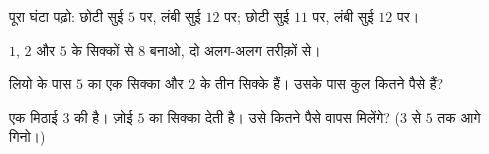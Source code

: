 \begin{exercise}[$\star$]\label{exo:g1:measure:6}
पूरा घंटा पढ़ो: छोटी सुई $5$ पर, लंबी सुई $12$ पर; छोटी
सुई $11$ पर, लंबी सुई $12$ पर।
\end{exercise}

\begin{exercise}[$\star$]\label{exo:g1:measure:7}
$1$, $2$ और $5$ के सिक्कों से $8$ बनाओ, दो अलग-अलग तरीक़ों से।
\end{exercise}

\begin{exercise}[$\star$]\label{exo:g1:measure:8}
लियो के पास $5$ का एक सिक्का और $2$ के तीन सिक्के हैं। उसके पास
कुल कितने पैसे हैं?
\end{exercise}

\begin{exercise}[$\star\star$]\label{exo:g1:measure:9}
एक मिठाई $3$ की है। ज़ोई $5$ का सिक्का देती है। उसे कितने पैसे
वापस मिलेंगे? ($3$ से $5$ तक आगे गिनो।)
\end{exercise}
